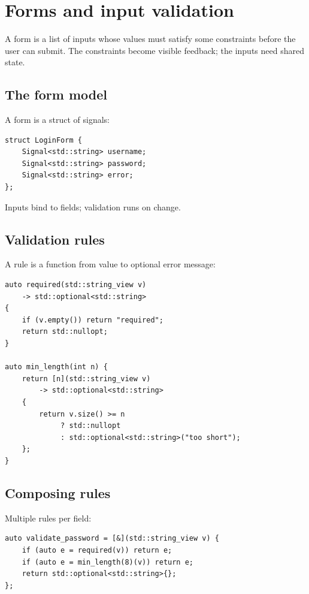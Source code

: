 \chapter{Forms and input validation}
\label{ch:forms}

\begin{aside}
A form is a list of inputs whose values must satisfy some
constraints before the user can submit. The constraints become
visible feedback; the inputs need shared state.
\end{aside}

\section{The form model}

A form is a struct of signals:

\begin{lstlisting}
struct LoginForm {
    Signal<std::string> username;
    Signal<std::string> password;
    Signal<std::string> error;
};
\end{lstlisting}

Inputs bind to fields; validation runs on change.

\section{Validation rules}

A rule is a function from value to optional error message:

\begin{lstlisting}
auto required(std::string_view v)
    -> std::optional<std::string>
{
    if (v.empty()) return "required";
    return std::nullopt;
}

auto min_length(int n) {
    return [n](std::string_view v)
        -> std::optional<std::string>
    {
        return v.size() >= n
             ? std::nullopt
             : std::optional<std::string>("too short");
    };
}
\end{lstlisting}

\section{Composing rules}

Multiple rules per field:

\begin{lstlisting}
auto validate_password = [&](std::string_view v) {
    if (auto e = required(v)) return e;
    if (auto e = min_length(8)(v)) return e;
    return std::optional<std::string>{};
};
\end{lstlisting}

